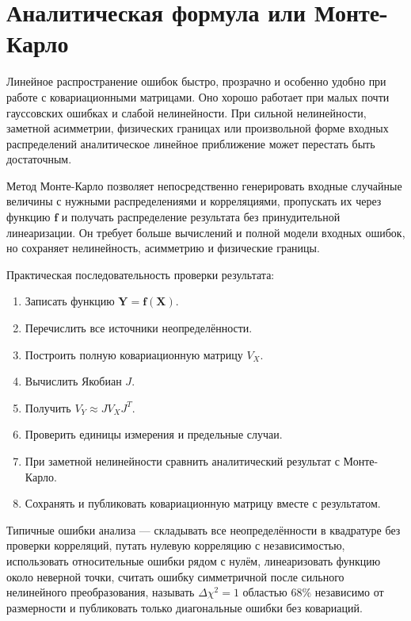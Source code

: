 \documentclass[
  russian,
  12pt,
  a4paper,
  a4paper,
  openany]{scrbook}
\providecommand{\tightlist}{%
  \setlength{\itemsep}{0pt}\setlength{\parskip}{0pt}}
\begin{document}
\section{Аналитическая формула или
Монте-Карло}\label{ux430ux43dux430ux43bux438ux442ux438ux447ux435ux441ux43aux430ux44f-ux444ux43eux440ux43cux443ux43bux430-ux438ux43bux438-ux43cux43eux43dux442ux435-ux43aux430ux440ux43bux43e}

Линейное распространение ошибок быстро, прозрачно и особенно удобно при
работе с ковариационными матрицами. Оно хорошо работает при малых почти
гауссовских ошибках и слабой нелинейности. При сильной нелинейности,
заметной асимметрии, физических границах или произвольной форме входных
распределений аналитическое линейное приближение может перестать быть
достаточным.

Метод Монте-Карло позволяет непосредственно генерировать входные
случайные величины с нужными распределениями и корреляциями, пропускать
их через функцию \(\mathbf f\) и получать распределение результата без
принудительной линеаризации. Он требует больше вычислений и полной
модели входных ошибок, но сохраняет нелинейность, асимметрию и
физические границы.

\begin{booknote}

Практическая последовательность проверки результата:

\begin{enumerate}
\def\labelenumi{\arabic{enumi}.}
\tightlist
\item
  Записать функцию \(\mathbf Y=\mathbf f(\mathbf X)\).
\item
  Перечислить все источники неопределённости.
\item
  Построить полную ковариационную матрицу \(V_X\).
\item
  Вычислить Якобиан \(J\).
\item
  Получить \(V_Y\approx JV_XJ^T\).
\item
  Проверить единицы измерения и предельные случаи.
\item
  При заметной нелинейности сравнить аналитический результат с
  Монте-Карло.
\item
  Сохранять и публиковать ковариационную матрицу вместе с результатом.
\end{enumerate}

\end{booknote}

Типичные ошибки анализа --- складывать все неопределённости в квадратуре
без проверки корреляций, путать нулевую корреляцию с независимостью,
использовать относительные ошибки рядом с нулём, линеаризовать функцию
около неверной точки, считать ошибку симметричной после сильного
нелинейного преобразования, называть \(\Delta\chi^2=1\) областью
\(68\%\) независимо от размерности и публиковать только диагональные
ошибки без ковариаций.
\end{document}
